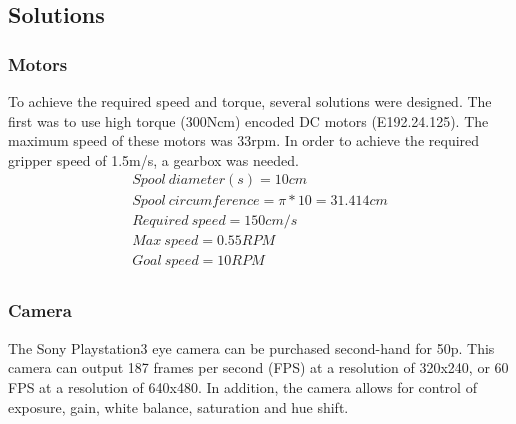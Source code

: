 \documentclass[conference]{IEEEtran}
\begin{document}
\subsection{Solutions}
\subsubsection{Motors}
To achieve the required speed and torque, several solutions were designed. The first was to use high torque (300Ncm) encoded DC motors (E192.24.125). The maximum speed of these motors was 33rpm. In order to achieve the required gripper speed of 1.5m/s, a gearbox was needed.
\begin{equation}
\begin{aligned}
Spool\ diameter (s) = 10cm\\
Spool\ circumference = \pi * 10 = 31.414cm\\
Required\ speed = 150cm / s \\
Max\ speed = 0.55RPM\\
Goal\ speed = 10 RPM\\
\end{aligned}
\end{equation}
\subsubsection{Camera}
The Sony Playstation3 eye camera can be purchased second-hand for 50p. This camera can output 187 frames per second (FPS) at a resolution of 320x240, or 60 FPS at a resolution of 640x480. In addition, the camera allows for control of exposure, gain, white balance, saturation and hue shift.
\end{document}
